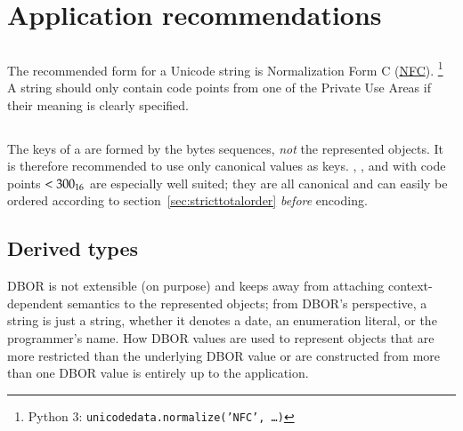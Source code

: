 
\section{Application recommendations}
\label{sec:applicationrecommendations}

\subsection{\DborUtfEightStringValue}

The recommended form for a Unicode string is
Normalization Form C (\href{https://www.unicode.org/versions/Unicode13.0.0/ch03.pdf\#G31703}{NFC}).%
\footnote{
    Python 3: \texttt{unicodedata.normalize('NFC', \dots)}
}
A string should only contain code points from one of the Private Use Areas if their meaning is clearly specified.


\subsection{\DborDictionaryValue}

The keys of a \DborDictionaryValue{} are formed by the bytes sequences, \emph{not} the represented objects.
It is therefore recommended to use only canonical values as keys.
\DborIntegerValue{}, \DborByteStringValue{}, and \DborUtfEightStringValue{} with code points $< \mathrm{300}_{16}$
are especially well suited;
they are all canonical and can easily be ordered according to section~\ref{sec:stricttotalorder} \emph{before} encoding.


\subsection{Derived types}

DBOR is not extensible (on purpose) and keeps away from attaching context-dependent semantics to the represented objects;
from DBOR's perspective, a string is just a string, whether it denotes a date, an enumeration literal,
or the programmer's name.
How DBOR values are used to represent objects that
are more restricted than the underlying DBOR value or
are constructed from more than one DBOR value
is entirely up to the application.

